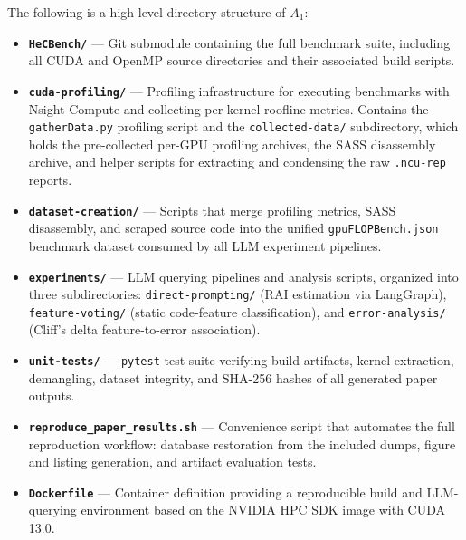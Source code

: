 The following is a high-level directory structure of $A_1$:

\begin{itemize}
    \item \textbf{\texttt{HeCBench/}} --- Git submodule containing the full \hecbench benchmark suite, including all CUDA and OpenMP source directories and their associated build scripts.
    
    \item \textbf{\texttt{cuda-profiling/}} --- Profiling infrastructure for executing benchmarks with Nsight Compute and collecting per-kernel roofline metrics.
    Contains the \texttt{gatherData.py} profiling script and the \texttt{collected-data/} subdirectory, which holds the pre-collected per-GPU profiling archives, the SASS disassembly archive, and helper scripts for extracting and condensing the raw \texttt{.ncu-rep} reports.
    
    \item \textbf{\texttt{dataset-creation/}} --- Scripts that merge profiling metrics, SASS disassembly, and scraped source code into the unified \texttt{gpuFLOPBench.json} benchmark dataset consumed by all LLM experiment pipelines.
    
    \item \textbf{\texttt{experiments/}} --- LLM querying pipelines and analysis scripts, organized into three subdirectories: \texttt{direct-prompting/} (RAI estimation via LangGraph), \texttt{feature-voting/} (static code-feature classification), and \texttt{error-analysis/} (Cliff's delta feature-to-error association).
    
    \item \textbf{\texttt{unit-tests/}} --- \texttt{pytest} test suite verifying build artifacts, kernel extraction, demangling, dataset integrity, and SHA-256 hashes of all generated paper outputs.
    
    \item \textbf{\texttt{reproduce\_paper\_results.sh}} --- Convenience script that automates the full reproduction workflow: database restoration from the included dumps, figure and listing generation, and artifact evaluation tests.
    
    \item \textbf{\texttt{Dockerfile}} --- Container definition providing a reproducible build and LLM-querying environment based on the NVIDIA HPC SDK image with CUDA 13.0.
\end{itemize}

